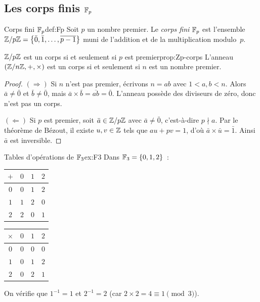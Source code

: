 \subsection{Les corps finis ${\mathbb{F}}_p$}\label{subsec:corps-Fp}

\begin{definition}{Corps fini ${\mathbb{F}}_p$}{def:Fp}
  Soit $p$ un nombre premier. Le \emph{corps fini}
  ${\mathbb{F}}_p$ est l'ensemble ${\mathbb{Z}}/p{\mathbb{Z}} = \left\{\bar{0},\bar{1},\ldots,\overline{p-1}\right\}$
  muni de l'addition et de la multiplication modulo~$p$.
\end{definition}

\begin{proposition}{${\mathbb{Z}}/p{\mathbb{Z}}$ est un corps si et seulement si $p$ est premier}{prop:Zp-corps}
  L'anneau $({\mathbb{Z}}/n{\mathbb{Z}},+,\times)$ est un corps si et seulement si $n$ est
  un nombre premier.
\end{proposition}

\begin{proof}
  $(\Rightarrow)$ Si $n$ n'est pas premier, écrivons $n=ab$ avec
  $1<a,b<n$. Alors $\bar{a}\neq\bar{0}$ et $\bar{b}\neq\bar{0}$, mais
  $\bar{a}\times\bar{b}=\overline{ab}=\bar{0}$. L'anneau possède des
  diviseurs de zéro, donc n'est pas un corps.

  $(\Leftarrow)$ Si $p$ est premier, soit $\bar{a}\in{\mathbb{Z}}/p{\mathbb{Z}}$ avec
  $\bar{a}\neq\bar{0}$, c'est-à-dire $p\nmid a$. Par le théorème de
  Bézout, il existe $u,v\in{\mathbb{Z}}$ tels que $au+pv=1$, d'où
  $\bar{a}\times\bar{u}=\bar{1}$. Ainsi $\bar{a}$ est inversible.
\end{proof}

\begin{example}{Tables d'opérations de ${\mathbb{F}}_3$}{ex:F3}
  Dans ${\mathbb{F}}_3=\left\{0,1,2\right\}$~:

  \medskip
  \begin{minipage}{0.45\textwidth}
  \centering
  \begin{tabular}{c|ccc}
    $+$ & $0$ & $1$ & $2$ \\\hline
    $0$ & $0$ & $1$ & $2$ \\
    $1$ & $1$ & $2$ & $0$ \\
    $2$ & $2$ & $0$ & $1$ \\
  \end{tabular}
  \end{minipage}
  \begin{minipage}{0.45\textwidth}
  \centering
  \begin{tabular}{c|ccc}
    $\times$ & $0$ & $1$ & $2$ \\\hline
    $0$ & $0$ & $0$ & $0$ \\
    $1$ & $0$ & $1$ & $2$ \\
    $2$ & $0$ & $2$ & $1$ \\
  \end{tabular}
  \end{minipage}

  \medskip
  On vérifie que $1^{-1}=1$ et $2^{-1}=2$ (car $2\times 2=4\equiv 1\pmod{3}$).
\end{example}

